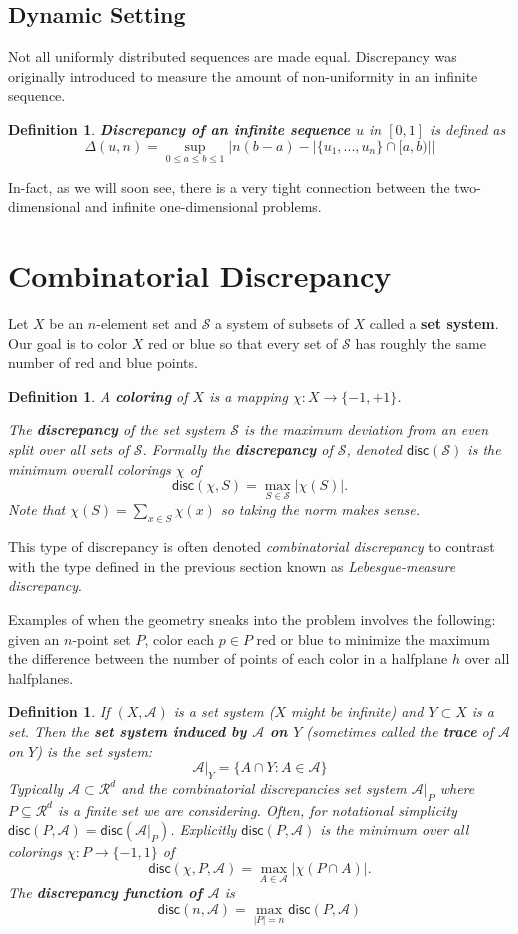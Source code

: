\documentclass[twoside]{article}
\newtheorem{definition}[theorem]{Definition}
\newcommand\R{\mathcal{R}}
\newcommand\disc{\mathsf{disc}}
\newcommand\A{\mathcal{A}}
\newcommand\SSet{\mathcal{S}}
\begin{document}
\subsection{Dynamic Setting}
Not all uniformly distributed sequences are made equal. Discrepancy was originally introduced to measure the amount of non-uniformity in an infinite sequence.

\begin{definition}
\textbf{Discrepancy of an infinite sequence $u$} in $[0,1]$ is defined as 
\[\Delta(u, n) = \sup_{0\leq a\leq b\leq 1} \left| n(b-a) - \left| \{u_1, ..., u_n\} \cap [a, b) \right| \right| \]
\end{definition}

In-fact, as we will soon see, there is a very tight connection between the two-dimensional and infinite one-dimensional problems.

\section{Combinatorial Discrepancy}
Let $X$ be an $n$-element set and $\SSet$ a system of subsets of $X$ called a \textbf{set system}. Our goal is to color $X$ red or blue so that every set of $\SSet$ has roughly the same number of red and blue points.

\begin{definition}
A \textbf{coloring} of $X$ is a mapping $\chi: X \rightarrow \{-1, +1\}$. 

The \textbf{discrepancy} of the set system $\SSet$ is the maximum deviation from an even split over all sets of $\SSet$. Formally the \textbf{discrepancy} of $\SSet$, denoted $\disc(\SSet)$ is the minimum overall colorings $\chi$ of
\[\disc(\chi, S) = \max_{S \in \SSet} |\chi(S)|.\]
Note that $\chi(S) = \sum_{x \in S} \chi(x)$ so taking the norm makes sense.  
\end{definition}

This type of discrepancy is often denoted \emph{combinatorial discrepancy} to contrast with the type defined in the previous section known as \emph{Lebesgue-measure discrepancy}.

Examples of when the geometry sneaks into the problem involves the following: given an $n$-point set $P$, color each $p \in P$ red or blue to minimize the maximum the difference between the number of points of each color in a halfplane $h$ over all halfplanes.

\begin{definition}
If $(X, \A)$ is a set system ($X$ might be infinite) and $Y \subset X$ is a set. Then the \textbf{set system induced by $\A$ on $Y$} (sometimes called the \textbf{trace} of $\A$ on $Y$) is the set system:
\[\A|_{Y} = \{A \cap Y: A \in \A\}\]
Typically $\A \subset \R^d$ and the combinatorial discrepancies set system $\A|_{P}$ where $P \subseteq \R^d$ is a finite set we are considering. Often, for notational simplicity $\disc(P, \A) = \disc(\A|_{P})$. Explicitly $\disc(P, \A)$ is the minimum over all colorings $\chi: P \rightarrow \{-1, 1\}$ of 
\[\disc(\chi, P, \A) = \max_{A \in \A} |\chi(P \cap A)|.\]
The \textbf{discrepancy function of $\A$} is
\[\disc(n, \A) = \max_{|P| = n} \disc(P, \A)\] 
\end{definition}
\end{document}

